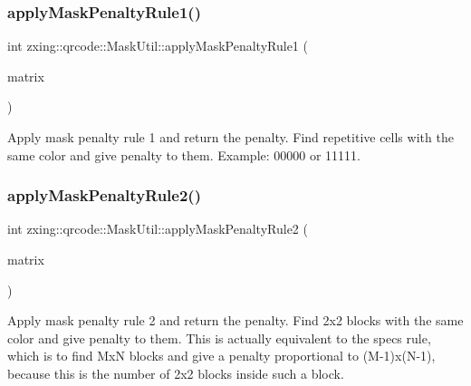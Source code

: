\subsubsection{\texorpdfstring{apply\+Mask\+Penalty\+Rule1()}{applyMaskPenaltyRule1()}}
{\footnotesize\ttfamily int zxing\+::qrcode\+::\+Mask\+Util\+::apply\+Mask\+Penalty\+Rule1 (\begin{DoxyParamCaption}\item[{const \mbox{\hyperlink{classzxing_1_1qrcode_1_1_byte_matrix}{Byte\+Matrix}} \&}]{matrix }\end{DoxyParamCaption})\hspace{0.3cm}{\ttfamily [static]}}

Apply mask penalty rule 1 and return the penalty. Find repetitive cells with the same color and give penalty to them. Example\+: 00000 or 11111. \mbox{\label{classzxing_1_1qrcode_1_1_mask_util_ae3fc0a63e7e43c0400cace1f98770d7c}} 
\subsubsection{\texorpdfstring{apply\+Mask\+Penalty\+Rule2()}{applyMaskPenaltyRule2()}}
{\footnotesize\ttfamily int zxing\+::qrcode\+::\+Mask\+Util\+::apply\+Mask\+Penalty\+Rule2 (\begin{DoxyParamCaption}\item[{const \mbox{\hyperlink{classzxing_1_1qrcode_1_1_byte_matrix}{Byte\+Matrix}} \&}]{matrix }\end{DoxyParamCaption})\hspace{0.3cm}{\ttfamily [static]}}

Apply mask penalty rule 2 and return the penalty. Find 2x2 blocks with the same color and give penalty to them. This is actually equivalent to the spec\textquotesingle{}s rule, which is to find MxN blocks and give a penalty proportional to (M-\/1)x(N-\/1), because this is the number of 2x2 blocks inside such a block. \mbox{\label{classzxing_1_1qrcode_1_1_mask_util_abc9c4ac729e26f9d61d8c1ed856477cf}} 
